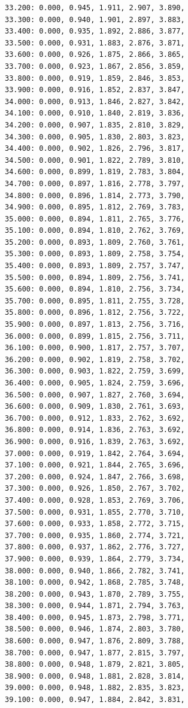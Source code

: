 \documentclass[12pt, a4paper]{article}
\begin{document}
\begin{scriptsize}
\begin{ttfamily}
\begin{lstlisting}
33.200: 0.000, 0.945, 1.911, 2.907, 3.890, 
33.300: 0.000, 0.940, 1.901, 2.897, 3.883, 
33.400: 0.000, 0.935, 1.892, 2.886, 3.877, 
33.500: 0.000, 0.931, 1.883, 2.876, 3.871, 
33.600: 0.000, 0.926, 1.875, 2.866, 3.865, 
33.700: 0.000, 0.923, 1.867, 2.856, 3.859, 
33.800: 0.000, 0.919, 1.859, 2.846, 3.853, 
33.900: 0.000, 0.916, 1.852, 2.837, 3.847, 
34.000: 0.000, 0.913, 1.846, 2.827, 3.842, 
34.100: 0.000, 0.910, 1.840, 2.819, 3.836, 
34.200: 0.000, 0.907, 1.835, 2.810, 3.829, 
34.300: 0.000, 0.905, 1.830, 2.803, 3.823, 
34.400: 0.000, 0.902, 1.826, 2.796, 3.817, 
34.500: 0.000, 0.901, 1.822, 2.789, 3.810, 
34.600: 0.000, 0.899, 1.819, 2.783, 3.804, 
34.700: 0.000, 0.897, 1.816, 2.778, 3.797, 
34.800: 0.000, 0.896, 1.814, 2.773, 3.790, 
34.900: 0.000, 0.895, 1.812, 2.769, 3.783, 
35.000: 0.000, 0.894, 1.811, 2.765, 3.776, 
35.100: 0.000, 0.894, 1.810, 2.762, 3.769, 
35.200: 0.000, 0.893, 1.809, 2.760, 3.761, 
35.300: 0.000, 0.893, 1.809, 2.758, 3.754, 
35.400: 0.000, 0.893, 1.809, 2.757, 3.747, 
35.500: 0.000, 0.894, 1.809, 2.756, 3.741, 
35.600: 0.000, 0.894, 1.810, 2.756, 3.734, 
35.700: 0.000, 0.895, 1.811, 2.755, 3.728, 
35.800: 0.000, 0.896, 1.812, 2.756, 3.722, 
35.900: 0.000, 0.897, 1.813, 2.756, 3.716, 
36.000: 0.000, 0.899, 1.815, 2.756, 3.711, 
36.100: 0.000, 0.900, 1.817, 2.757, 3.707, 
36.200: 0.000, 0.902, 1.819, 2.758, 3.702, 
36.300: 0.000, 0.903, 1.822, 2.759, 3.699, 
36.400: 0.000, 0.905, 1.824, 2.759, 3.696, 
36.500: 0.000, 0.907, 1.827, 2.760, 3.694, 
36.600: 0.000, 0.909, 1.830, 2.761, 3.693, 
36.700: 0.000, 0.912, 1.833, 2.762, 3.692, 
36.800: 0.000, 0.914, 1.836, 2.763, 3.692, 
36.900: 0.000, 0.916, 1.839, 2.763, 3.692, 
37.000: 0.000, 0.919, 1.842, 2.764, 3.694, 
37.100: 0.000, 0.921, 1.844, 2.765, 3.696, 
37.200: 0.000, 0.924, 1.847, 2.766, 3.698, 
37.300: 0.000, 0.926, 1.850, 2.767, 3.702, 
37.400: 0.000, 0.928, 1.853, 2.769, 3.706, 
37.500: 0.000, 0.931, 1.855, 2.770, 3.710, 
37.600: 0.000, 0.933, 1.858, 2.772, 3.715, 
37.700: 0.000, 0.935, 1.860, 2.774, 3.721, 
37.800: 0.000, 0.937, 1.862, 2.776, 3.727, 
37.900: 0.000, 0.939, 1.864, 2.779, 3.734, 
38.000: 0.000, 0.940, 1.866, 2.782, 3.741, 
38.100: 0.000, 0.942, 1.868, 2.785, 3.748, 
38.200: 0.000, 0.943, 1.870, 2.789, 3.755, 
38.300: 0.000, 0.944, 1.871, 2.794, 3.763, 
38.400: 0.000, 0.945, 1.873, 2.798, 3.771, 
38.500: 0.000, 0.946, 1.874, 2.803, 3.780, 
38.600: 0.000, 0.947, 1.876, 2.809, 3.788, 
38.700: 0.000, 0.947, 1.877, 2.815, 3.797, 
38.800: 0.000, 0.948, 1.879, 2.821, 3.805, 
38.900: 0.000, 0.948, 1.881, 2.828, 3.814, 
39.000: 0.000, 0.948, 1.882, 2.835, 3.823, 
39.100: 0.000, 0.947, 1.884, 2.842, 3.831, 

\end{lstlisting}
\end{ttfamily}
\end{scriptsize}
\end{document}
